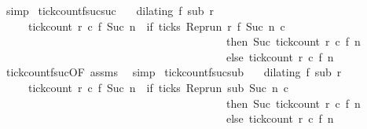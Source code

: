 \begin{isabellebody}
\ simp%
\endisatagproof
{\isafoldproof}%
%
\isadelimproof
\isanewline
%
\endisadelimproof
\isanewline
{}\isamarkupfalse%
\ tick{\isacharunderscore}count{\isacharunderscore}f{\isacharunderscore}suc{\isacharunderscore}suc{\isacharcolon}\isanewline
\ \ \ {\isacartoucheopen}dilating\ f\ sub\ r{\isacartoucheclose}\isanewline
\ \ \ \ \ {\isacartoucheopen}tick{\isacharunderscore}count\ r\ c\ {\isacharparenleft}f\ {\isacharparenleft}Suc\ n{\isacharparenright}{\isacharparenright}\ {\isacharequal}\ {\isacharparenleft}if\ ticks\ {\isacharparenleft}{\isacharparenleft}Rep{\isacharunderscore}run\ r{\isacharparenright}\ {\isacharparenleft}f\ {\isacharparenleft}Suc\ n{\isacharparenright}{\isacharparenright}\ c{\isacharparenright}\isanewline
\ \ \ \ \ \ \ \ \ \ \ \ \ \ \ \ \ \ \ \ \ \ \ \ \ \ \ \ \ \ \ \ \ \ \ \ \ \ \ \ \ then\ Suc\ {\isacharparenleft}tick{\isacharunderscore}count\ r\ c\ {\isacharparenleft}f\ n{\isacharparenright}{\isacharparenright}\isanewline
\ \ \ \ \ \ \ \ \ \ \ \ \ \ \ \ \ \ \ \ \ \ \ \ \ \ \ \ \ \ \ \ \ \ \ \ \ \ \ \ \ else\ tick{\isacharunderscore}count\ r\ c\ {\isacharparenleft}f\ n{\isacharparenright}{\isacharparenright}{\isacartoucheclose}\isanewline
%
\isadelimproof
%
\endisadelimproof
%
\isatagproof
{}\isamarkupfalse%
\ tick{\isacharunderscore}count{\isacharunderscore}f{\isacharunderscore}suc{\isacharbrackleft}OF\ assms{\isacharbrackright}\ \isamarkupfalse%
\ simp%
\endisatagproof
{\isafoldproof}%
%
\isadelimproof
\isanewline
%
\endisadelimproof
\isanewline
{}\isamarkupfalse%
\ tick{\isacharunderscore}count{\isacharunderscore}f{\isacharunderscore}suc{\isacharunderscore}sub{\isacharcolon}\isanewline
\ \ \ {\isacartoucheopen}dilating\ f\ sub\ r{\isacartoucheclose}\isanewline
\ \ \ \ \ {\isacartoucheopen}tick{\isacharunderscore}count\ r\ c\ {\isacharparenleft}f\ {\isacharparenleft}Suc\ n{\isacharparenright}{\isacharparenright}\ {\isacharequal}\ {\isacharparenleft}if\ ticks\ {\isacharparenleft}{\isacharparenleft}Rep{\isacharunderscore}run\ sub{\isacharparenright}\ {\isacharparenleft}Suc\ n{\isacharparenright}\ c{\isacharparenright}\isanewline
\ \ \ \ \ \ \ \ \ \ \ \ \ \ \ \ \ \ \ \ \ \ \ \ \ \ \ \ \ \ \ \ \ \ \ \ \ \ \ \ \ then\ Suc\ {\isacharparenleft}tick{\isacharunderscore}count\ r\ c\ {\isacharparenleft}f\ n{\isacharparenright}{\isacharparenright}\isanewline
\ \ \ \ \ \ \ \ \ \ \ \ \ \ \ \ \ \ \ \ \ \ \ \ \ \ \ \ \ \ \ \ \ \ \ \ \ \ \ \ \ else\ tick{\isacharunderscore}count\ r\ c\ {\isacharparenleft}f\ n{\isacharparenright}{\isacharparenright}{\isacartoucheclose}\isanewline

\end{isabellebody}
